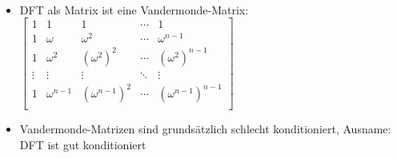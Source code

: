 \begin{frame}{\insertsection}
	\framesubtitle{\insertsubsection}
	\begin{itemize}
		\item DFT als Matrix ist eine Vandermonde-Matrix: \\ \vspace{0.5em}
		$\begin{bmatrix}
			1 & 1 & 1 & \cdots & 1 \\
			1 & \omega & \omega^2 & \cdots & \omega^{n-1} \\
			1 & \omega^2 & (\omega^2)^2 & \cdots & (\omega^2)^{n-1} \\
			\vdots & \vdots & \vdots & \ddots & \vdots \\
			1 & \omega^{n-1} & (\omega^{n-1})^2 & \cdots & (\omega^{n-1})^{n-1} \\
		\end{bmatrix} $ \vspace{0.5em}
		\item Vandermonde-Matrizen sind grundsätzlich schlecht konditioniert,
		Ausname: DFT ist gut konditioniert
	\end{itemize}
\end{frame}


